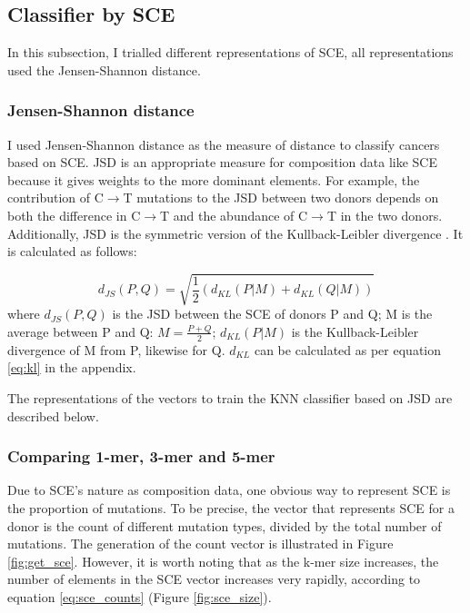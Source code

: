 \subsection{Classifier by SCE}\label{methods:ml_sce}
In this subsection, I trialled different representations of SCE, all representations used the Jensen-Shannon distance. 

\subsubsection{Jensen-Shannon distance}
I used Jensen-Shannon distance \citep[JSD;][]{Osterreicher2003} as the measure of distance to classify cancers based on SCE. JSD is an appropriate measure for composition data like SCE because it gives weights to the more dominant elements. For example, the contribution of C$\rightarrow$T mutations to the JSD between two donors depends on both the difference in  C$\rightarrow$T and the abundance of C$\rightarrow$T in the two donors. Additionally, JSD is the symmetric version of the Kullback-Leibler divergence \citep{Kullback1951}. It is calculated as follows:

\begin{equation}
    d_{JS}(P,Q) = \sqrt{\frac{1}{2} (d_{KL}(P|M) + d_{KL}(Q|M))}
\end{equation}
where $d_{JS}(P,Q)$ is the JSD between the SCE of donors P and Q; M is the average between P and Q: $M = \frac{P+Q}{2}$; $d_{KL}(P|M)$ is the Kullback-Leibler divergence of M from P, likewise for Q. $d_{KL}$ can be calculated as per equation \ref{eq:kl} in the appendix.

The representations of the vectors to train the KNN classifier based on JSD are described below.

\subsubsection{Comparing 1-mer, 3-mer and 5-mer}
Due to SCE's nature as composition data, one obvious way to represent SCE is the proportion of mutations. To be precise, the vector that represents SCE for a donor is the count of different mutation types, divided by the total number of mutations. The generation of the count vector is illustrated in Figure \ref{fig:get_sce}. However, it is worth noting that as the k-mer size increases, the number of elements in the SCE vector increases very rapidly, according to equation \ref{eq:sce_counts} (Figure \ref{fig:sce_size}).



